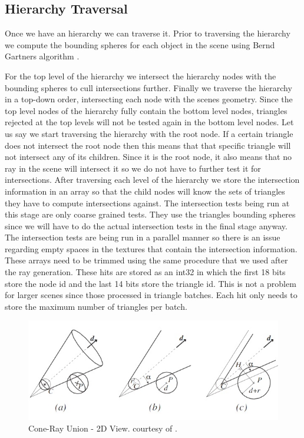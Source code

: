 \subsection{Hierarchy Traversal}

Once we have an hierarchy we can traverse it. Prior to traversing the hierarchy we compute the bounding spheres for each object in the scene using Bernd Gartners algorithm \cite{Gartner99}.

For the top level of the hierarchy we intersect the hierarchy nodes with the bounding spheres to cull intersections further. Finally we traverse the hierarchy in a top-down order, intersecting each node with the scenes geometry. Since the top level nodes of the hierarchy fully contain the bottom level nodes, triangles rejected at the top levels will not be tested again in the bottom level nodes. Let us say we start traversing the hierarchy with the root node. If a certain triangle does not intersect the root node then this means that that specific triangle will not intersect any of its children. Since it is the root node, it also means that no ray in the scene will intersect it so we do not have to further test it for intersections. After traversing each level of the hierarchy we store the intersection information in an array so that the child nodes will know the sets of triangles they have to compute intersections against. The intersection tests being run at this stage are only coarse grained tests. They use the triangles bounding spheres since we will have to do the actual intersection tests in the final stage anyway. The intersection tests are being run in a parallel manner so there is an issue regarding empty spaces in the textures that contain the intersection information. These arrays need to be trimmed using the same procedure that we used after the ray generation. These hits are stored as an int32 in which the first 18 bits store the node id and the last 14 bits store the triangle id. This is not a problem for larger scenes since those processed in triangle batches. Each hit only needs to store the maximum number of triangles per batch.

\begin{figure}[!htb]
    \centering
    \includegraphics[scale=0.50]{Images/Node_Sphere_Intersection}
    \caption{\label{fig:crud2}Cone-Ray Union - 2D View. \small courtesy of \cite{Roger07}.}
\end{figure}

